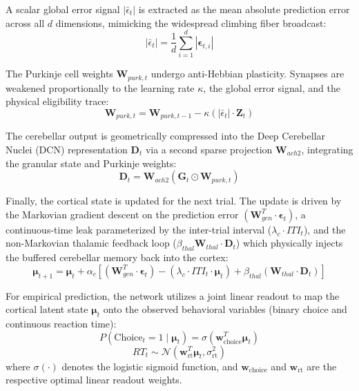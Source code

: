 \documentclass[12pt, a4paper]{extarticle}
\begin{document}
	A scalar global error signal $\left| \bar{\epsilon}_{t} \right|$ is extracted as the mean absolute prediction error across all $d$ dimensions, mimicking the widespread climbing fiber broadcast:
	\begin{equation}
		\left| \bar{\epsilon}_{t} \right| = \frac{1}{d} \sum_{i=1}^{d} \left| \boldsymbol{\epsilon}_{t, i} \right|\label{c_pe}
	\end{equation}
	
	The Purkinje cell weights $\mathbf{W}_{purk, t}$ undergo anti-Hebbian plasticity. Synapses are weakened proportionally to the learning rate $\kappa$, the global error signal, and the physical eligibility trace:
	\begin{equation}
		\mathbf{W}_{purk, t} = \mathbf{W}_{purk, t-1} - \kappa ( \left| \bar{\epsilon}_{t} \right| \cdot \mathbf{Z}_{t})\label{purk}
	\end{equation}
	
	The cerebellar output is geometrically compressed into the Deep Cerebellar Nuclei (DCN) representation $\mathbf{D}_{t}$ via a second sparse projection $\mathbf{W}_{ach2}$, integrating the granular state and Purkinje weights:
	\begin{equation}
		\mathbf{D}_{t} = \mathbf{W}_{ach2} (\mathbf{G}_{t} \odot \mathbf{W}_{purk, t})\label{forward_pass}
	\end{equation}
	
	Finally, the cortical state is updated for the next trial. The update is driven by the Markovian gradient descent on the prediction error $(\mathbf{W}^{T}_{gen} \cdot \boldsymbol{\epsilon}_{t})$, a continuous-time leak parameterized by the inter-trial interval ($\lambda_{c} \cdot ITI_{t}$), and the non-Markovian thalamic feedback loop ($\beta_{thal} \mathbf{W}_{thal} \cdot \mathbf{D}_{t}$) which physically injects the buffered cerebellar memory back into the cortex:
	\begin{equation}
		\boldsymbol{\mu}_{t+1} = \boldsymbol{\mu}_{t} + \alpha_{c} \left[(\mathbf{W}^{T}_{gen} \cdot \boldsymbol{\epsilon}_{t}) - (\lambda_{c} \cdot ITI_{t} \cdot \boldsymbol{\mu}_{t}) + \beta_{thal} (\mathbf{W}_{thal} \cdot \mathbf{D}_{t})\right]\label{thalam_ctx_pass}
	\end{equation}
	
	For empirical prediction, the network utilizes a joint linear readout to map the cortical latent state $\boldsymbol{\mu}_t$ onto the observed behavioral variables (binary choice and continuous reaction time):
	\begin{equation}
		P(\text{Choice}_t = 1 \mid \boldsymbol{\mu}_t) = \sigma(\mathbf{w}_{\text{choice}}^T \boldsymbol{\mu}_t)
	\end{equation}
	\begin{equation}
		RT_t \sim \mathcal{N}(\mathbf{w}_{\text{rt}}^T \boldsymbol{\mu}_t, \sigma_{\text{rt}}^2)
	\end{equation}
	where $\sigma(\cdot)$ denotes the logistic sigmoid function, and $\mathbf{w}_{\text{choice}}$ and $\mathbf{w}_{\text{rt}}$ are the respective optimal linear readout weights.
	
\end{document}

